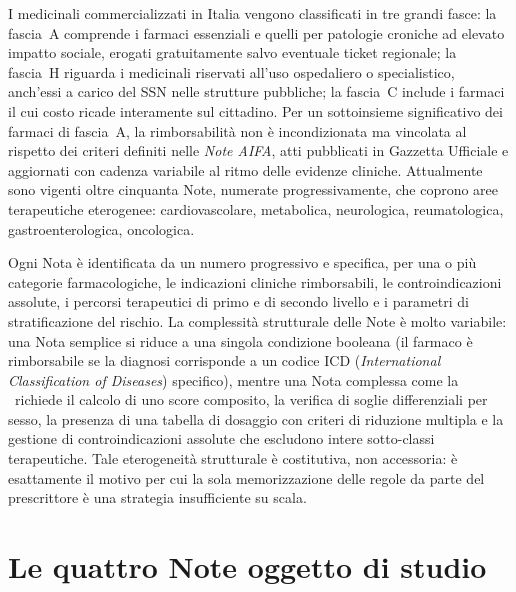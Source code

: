 I medicinali commercializzati in Italia vengono classificati in tre grandi fasce:
la fascia~A comprende i farmaci essenziali e quelli per patologie croniche ad elevato
impatto sociale, erogati gratuitamente salvo eventuale ticket regionale; la fascia~H
riguarda i medicinali riservati all'uso ospedaliero o specialistico, anch'essi
a carico del SSN nelle strutture pubbliche; la fascia~C include i farmaci il cui
costo ricade interamente sul cittadino.
Per un sottoinsieme significativo dei farmaci di fascia~A, la rimborsabilità
non è incondizionata ma vincolata al rispetto dei criteri definiti nelle
\emph{Note AIFA}, atti pubblicati in Gazzetta Ufficiale e aggiornati con cadenza
variabile al ritmo delle evidenze cliniche.
Attualmente sono vigenti oltre cinquanta Note, numerate progressivamente, che coprono aree terapeutiche eterogenee:
cardiovascolare, metabolica, neurologica, reumatologica, gastroenterologica,
oncologica.

Ogni Nota è identificata da un numero progressivo e specifica, per una o più
categorie farmacologiche, le indicazioni cliniche rimborsabili, le controindicazioni
assolute, i percorsi terapeutici di primo e di secondo livello e i parametri di
stratificazione del rischio.
La complessità strutturale delle Note è molto variabile: una Nota semplice si
riduce a una singola condizione booleana (il farmaco è rimborsabile se la diagnosi
corrisponde a un codice ICD (\emph{International Classification of Diseases}) specifico), mentre una Nota complessa come la
\notenova\ richiede il calcolo di uno score composito, la verifica di soglie
differenziali per sesso, la presenza di una tabella di dosaggio con criteri di
riduzione multipla e la gestione di controindicazioni assolute che escludono intere
sotto-classi terapeutiche.
Tale eterogeneità strutturale è costitutiva, non accessoria: è esattamente il
motivo per cui la sola memorizzazione delle regole da parte del prescrittore è
una strategia insufficiente su scala.

\section{Le quattro Note oggetto di studio}
\label{sec:quattro-note}


